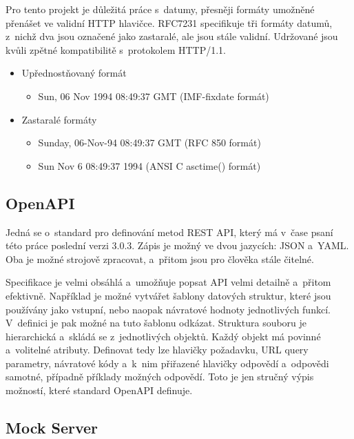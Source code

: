Pro tento projekt je důležitá práce s datumy, přesněji formáty umožněné přenášet ve validní HTTP hlavičce. RFC7231 specifikuje tři formáty datumů, z nichž dva
jsou označené jako zastaralé, ale jsou stále validní. Udržované jsou kvůli zpětné kompatibilitě s protokolem HTTP/1.1. \cite{RFC7231}

\begin{itemize}
    \item Upřednostňovaný formát
    \begin{itemize}
        \item Sun, 06 Nov 1994 08:49:37 GMT (IMF-fixdate formát)
    \end{itemize}
    \item Zastaralé formáty
    \begin{itemize}
        \item Sunday, 06-Nov-94 08:49:37 GMT (RFC 850 formát)
        \item Sun Nov  6 08:49:37 1994 (ANSI C asctime() formát)
    \end{itemize}
\end{itemize}

\subsection{OpenAPI}

Jedná se o standard pro definování metod REST API, který má v čase psaní této práce poslední verzi 3.0.3. Zápis je možný ve dvou jazycích: JSON a YAML. Oba 
je možné strojově zpracovat, a přitom jsou pro člověka stále čitelné. 

Specifikace je velmi obsáhlá a umožňuje popsat API velmi detailně a přitom efektivně. Například je možné vytvářet šablony datových struktur, které jsou používány jako
vstupní, nebo naopak návratové hodnoty jednotlivých funkcí. V definici je pak možné na tuto šablonu odkázat. Struktura souboru je hierarchická a skládá se z jednotlivých objektů.
Každý objekt má povinné a volitelné atributy. Definovat tedy lze hlavičky požadavku, URL query parametry, návratové kódy a k nim přiřazené hlavičky odpovědí a odpovědi samotné,
případně příklady možných odpovědí. Toto je jen stručný výpis možností, které standard OpenAPI definuje. \cite{OpenAPI}

\subsection{Mock Server}

